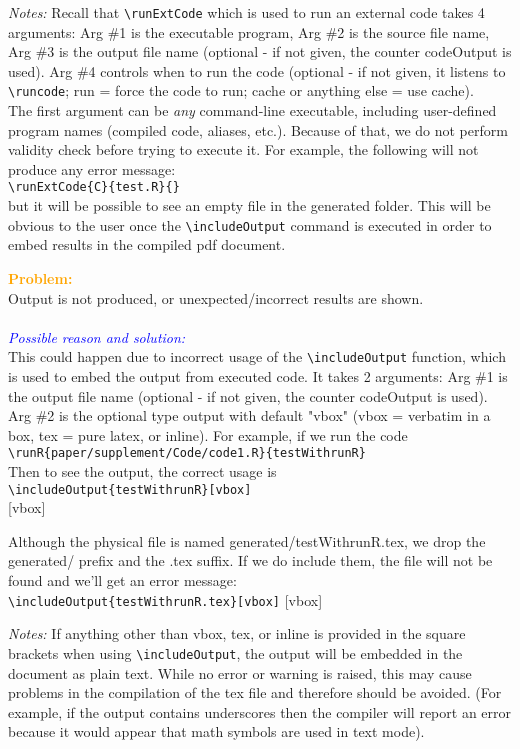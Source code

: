 \documentclass[a4paper,10pt]{article}
\newcommand{\prob}[1] {\bigskip\noindent\textbf{\textcolor{orange}{Problem:}}\\#1\\\\}
\newcommand{\cause}[1] {\noindent\textit{\textcolor{blue}{Possible reason and solution:}}\\#1}
\newcommand{\cmnt}[1] {\bigskip\noindent\textit{Notes:} #1}
\begin{document}
\cmnt\bgroup
Recall that \verb|\runExtCode| which is used to run an external code takes 4 arguments:
Arg \#1 is the executable program,
Arg \#2 is the source file name,
Arg \#3 is the output file name (optional - if not given, the counter 
        codeOutput is used).
Arg \#4 controls when to run the code (optional - if not given, it listens
        to \verb|\runcode|; run = force the code to run; cache or anything else =
        use cache).\\
The first argument can be \textit{any} command-line executable, including user-defined program names (compiled code, aliases, etc.). Because of that, we do not perform validity check before trying to execute it.
For example, the following will not produce any error message:\\
\verb|\runExtCode{C}{test.R}{}|\\
but it will be possible to see an empty file in the generated folder. This will be obvious to the user once the \verb|\includeOutput| command is executed in order to embed results in the compiled pdf document.
\egroup




\prob{Output is not produced, or unexpected/incorrect results are shown.}
\cause\bgroup
This could happen due to incorrect usage of the \verb|\includeOutput| function, which is used to embed the output from executed code. It takes 2 arguments:
Arg \#1 is the output file name (optional - if not given, the counter codeOutput is used).
Arg \#2 is the optional type output with default "vbox" (vbox = verbatim in a box, tex = pure latex, or inline).
For example, if we run the code\\
\verb|\runR{paper/supplement/Code/code1.R}{testWithrunR}|
\\
\noindent
Then to see the output, the correct usage is\\
\verb|\includeOutput{testWithrunR}[vbox]|\\
[vbox]

\noindent Although the physical file is named generated/testWithrunR.tex, we drop the generated/ prefix and the .tex suffix. If we do include them, the file will not be found and we'll get an error message:\\
\verb|\includeOutput{testWithrunR.tex}[vbox]|
[vbox]
\egroup

\cmnt\bgroup
If anything other than vbox, tex, or inline is provided in the square brackets when using \verb|\includeOutput|, the output will be embedded in the document as plain text. While no error or warning is raised, this may cause problems in the compilation of the tex file and therefore should be avoided. (For example, if the output contains underscores then the compiler will report an error because it would appear that math symbols are used in text mode).\\
\egroup
\end{document}
